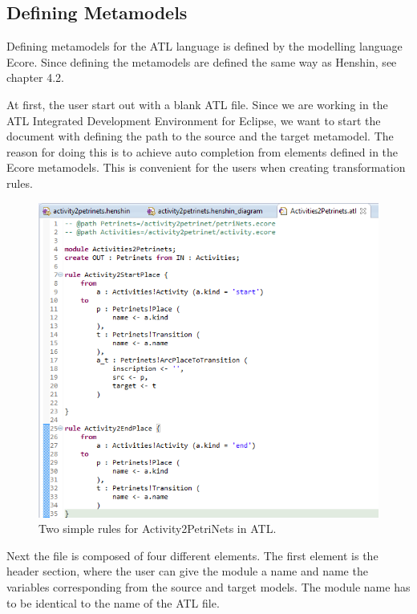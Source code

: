 \documentclass[pdftex,11pt,a4paper]{article}
\begin{document}
\subsection{Defining Metamodels}

Defining metamodels for the ATL language is defined by the modelling language
Ecore. Since defining the metamodels are defined the same way as Henshin, see
chapter 4.2.

At first, the user start out with a blank ATL file. Since we are working in
the ATL Integrated Development Environment for Eclipse, we want to start the
document with defining the path to the source and the target metamodel. The
reason for doing this is to achieve auto completion from elements defined in the
Ecore metamodels. This is convenient for the users when creating transformation
rules.  

\begin{figure}[H]
	\centering
	\includegraphics[scale=0.5]{figures/ATLScreen.png}
	\caption{Two simple rules for Activity2PetriNets in ATL.}
	\label{fig:ATL_Screen}
\end{figure}

Next the file is composed of four different elements. The first element is the
header section, where the user can give the module a name and name the variables
corresponding from the source and target models. The module name has to be
identical to the name of the ATL file.
\end{document}
